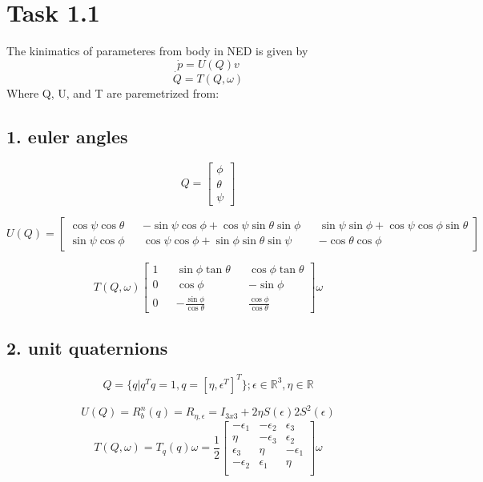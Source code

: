 \documentclass[11pt]{article}
\begin{document}
\section*{Task 1.1}
The kinimatics of parameteres from body in NED is given by 
\[ \dot{p} = U(Q) v \]
\[\dot{Q} = T(Q, \omega) \]
Where Q, U, and T are paremetrized from:
\subsection*{1. euler angles}
\[Q = 
\begin{bmatrix}
\phi \\ \theta \\ \psi
\end{bmatrix}
\]

\[ U(Q) = 
\begin{bmatrix}
\cos{\psi} \cos{\theta} && - \sin{\psi} \cos{\phi} + \cos{\psi} \sin{\theta} \sin{\phi} && \sin{\psi} \sin{\phi} + \cos{\psi} \cos{\phi} \sin{\theta} \\
\sin{\psi} \cos{\phi} && \cos{\psi} \cos{\phi} + \sin{\phi} \sin{\theta} \sin{\psi} && - \cos{\theta} \cos{\phi}
\end{bmatrix}
\]

\[ T(Q, \omega)
\begin{bmatrix}
\displaystyle
1 && \sin{\phi} \tan{\theta} && \cos{\phi} \tan{\theta} \\
0 && \cos{\phi} && - \sin{\phi} \\
0 && - \frac{ \sin{\phi} }{ \cos{\theta} } && \frac{ \cos{\phi} }{ \cos{\theta} }
\end{bmatrix} \omega
\]

\subsection*{2. unit quaternions}
\[Q = \{q|q^Tq = 1, q = [\eta,\epsilon^T]^T\};\epsilon \in \mathbb{R}^3, \eta \in \mathbb{R} \]

\[U(Q) = R_b^n(q) = R_{\eta,\epsilon} = I_{3x3} + 2\eta S(\epsilon) 2S^2(\epsilon) \]
\[ T(Q,\omega) = T_q(q)\omega = 
\frac{1}{2}
 \begin{bmatrix}
   -\epsilon_1 & -\epsilon_2 & \epsilon_3 \\
   \eta & -\epsilon_3 & \epsilon_2 \\
   \epsilon_3 & \eta & -\epsilon_1 \\
   -\epsilon_2 & \epsilon_1 & \eta \\
 \end{bmatrix}
 \omega
\]
\end{document}
